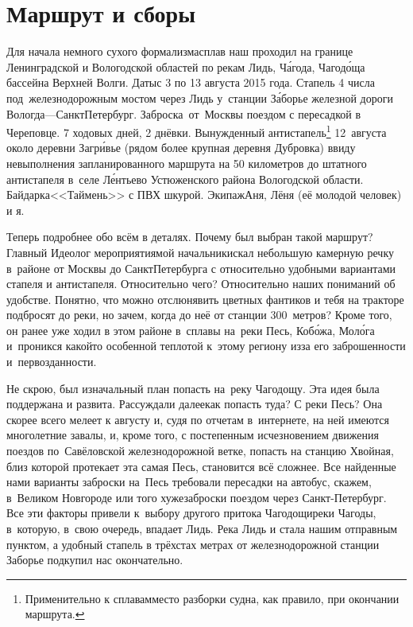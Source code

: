 \chapter{Маршрут и сборы}
\vepsianrose

\renewcommand*{\thefootnote}{\fnsymbol{footnote}}
Для начала немного сухого формализма\mdash сплав наш проходил на границе Ленинградской и Вологодской областей по рекам Лидь, Ч\'{а}года, Чагод\'{о}ща бассейна Верхней Волги. Даты\mdash с 3 по 13 августа 2015 года. Стапель 4 числа под~железнодорожным мостом через Лидь у~станции З\'{а}борье железной дороги Вологда\thinspace---\thinspace Санкт\sdash Петербург. Заброска~от~Москвы поездом с пересадкой в Череповце. 7 ходовых дней, 2 днёвки. Вынужденный антистапель\footnote[1]{Применительно к сплавам\mdash место разборки судна, как правило, при окончании маршрута.} 12~августа около деревни Загр\'{и}вье (рядом более крупная деревня Дубровка) ввиду невыполнения запланированного маршрута на 50 километров до штатного антистапеля в~селе Л\'{е}нтьево Устюженского района Вологодской области.  Байдарка\mdash <<Таймень>> с ПВХ шкурой. Экипаж\mdash Аня, Лёня (её молодой человек) и я.

\newpage
Теперь подробнее обо всём в деталях. Почему был выбран такой маршрут? Главный Идеолог мероприятия\mdash мой начальник\mdash искал небольшую камерную речку в~районе от Москвы до Санкт\sdash Петербурга с относительно удобными вариантами стапеля и антистапеля. Относительно чего? Относительно наших пониманий об удобстве. Понятно, что можно отслюнявить цветных фантиков и тебя на тракторе подбросят до реки, но зачем, когда до неё от станции 300~метров? Кроме того, он ранее уже ходил в этом районе в~сплавы на~реки Песь, Коб\'{о}жа, Мол\'{о}га и~проникся какой\sdash то особенной теплотой к~этому региону из\sdash за его заброшенности и~первозданности.

Не скрою, был изначальный план попасть на~реку Чагодощу. Эта идея была поддержана и развита. Рассуждали далее\mdash как попасть туда? С реки Песь? Она скорее всего мелеет к августу и, судя по отчетам в~интернете, на ней имеются многолетние завалы, и, кроме того, с постепенным исчезновением движения поездов по~Савёловской железнодорожной ветке, попасть на станцию Хвойная, близ которой протекает эта самая Песь, становится всё сложнее. Все найденные нами варианты заброски на~Песь требовали пересадки на автобус, скажем, в~Великом Новгороде или того хуже\mdash заброски поездом через Санкт-Петербург. Все эти факторы привели к~выбору другого притока Чагодощи\mdash реки Чагоды, в~которую, в~свою очередь, впадает Лидь. Река Лидь и стала нашим отправным пунктом, а удобный стапель в трёхстах метрах от железнодорожной станции Заборье подкупил нас окончательно. 

